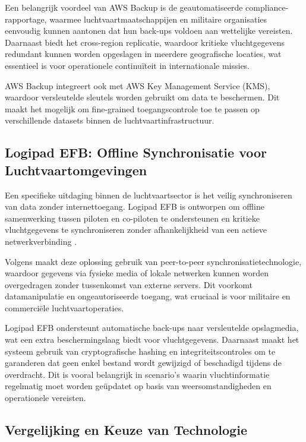 Een belangrijk voordeel van AWS Backup is de geautomatiseerde compliance-rapportage, waarmee luchtvaartmaatschappijen en militaire organisaties eenvoudig kunnen aantonen dat hun back-ups voldoen aan wettelijke vereisten. Daarnaast biedt het cross-region replicatie, waardoor kritieke vluchtgegevens redundant kunnen worden opgeslagen in meerdere geografische locaties, wat essentieel is voor operationele continuïteit in internationale missies.

AWS Backup integreert ook met AWS Key Management Service (KMS), waardoor versleutelde sleutels worden gebruikt om data te beschermen. Dit maakt het mogelijk om fine-grained toegangscontrole toe te passen op verschillende datasets binnen de luchtvaartinfrastructuur.

\subsection{Logipad EFB: Offline Synchronisatie voor Luchtvaartomgevingen}
\label{subsec:logipad}

Een specifieke uitdaging binnen de luchtvaartsector is het veilig synchroniseren van data zonder internettoegang. Logipad EFB is ontworpen om offline samenwerking tussen piloten en co-piloten te ondersteunen en kritieke vluchtgegevens te synchroniseren zonder afhankelijkheid van een actieve netwerkverbinding \autocite{LogipadEFB}.

Volgens \textcite{LogipadEFB} maakt deze oplossing gebruik van peer-to-peer synchronisatietechnologie, waardoor gegevens via fysieke media of lokale netwerken kunnen worden overgedragen zonder tussenkomst van externe servers. Dit voorkomt datamanipulatie en ongeautoriseerde toegang, wat cruciaal is voor militaire en commerciële luchtvaartoperaties.

Logipad EFB ondersteunt automatische back-ups naar versleutelde opslagmedia, wat een extra beschermingslaag biedt voor vluchtgegevens. Daarnaast maakt het systeem gebruik van cryptografische hashing en integriteitscontroles om te garanderen dat geen enkel bestand wordt gewijzigd of beschadigd tijdens de overdracht. Dit is vooral belangrijk in scenario’s waarin vluchtinformatie regelmatig moet worden geüpdatet op basis van weersomstandigheden en operationele vereisten.

\subsection{Vergelijking en Keuze van Technologie}
\label{subsec:vergelijking}

